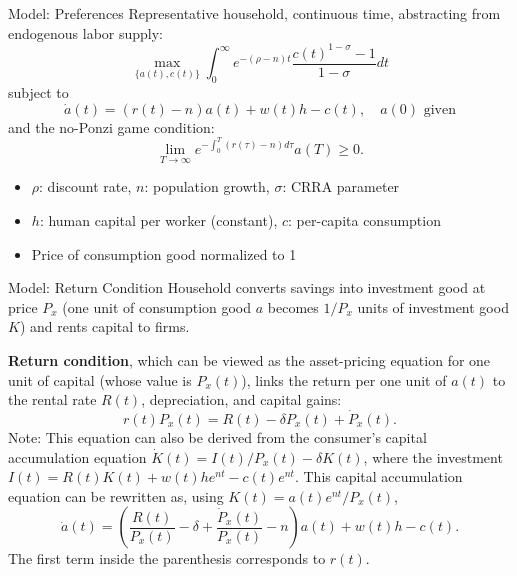 \documentclass[blue]{beamer}
\begin{document}
\begin{frame}{Model: Preferences}
	Representative household, continuous time, abstracting from endogenous labor supply:
	\[
	\max_{\{a(t), c(t)\}} \int_0^\infty e^{-(\rho - n)t} \frac{c(t)^{1-\sigma} - 1}{1-\sigma} dt 
	\]
	subject to
	\[
	\dot{a}(t) = (r(t) - n) a(t) + w(t)h - c(t), \quad a(0) \text{ given}
	\]
	and the no-Ponzi game condition:
	$$\lim_{T\to\infty} e^{-\int_0^T (r(\tau)-n) d\tau} a(T) \geq 0.
	$$
	
	\begin{itemize}
		\item $\rho$: discount rate, $n$: population growth, $\sigma$: CRRA parameter
		\item $h$: human capital per worker (constant), $c$: per-capita consumption
		\item Price of consumption good normalized to 1
	\end{itemize}
\end{frame}


\begin{frame}{Model: Return Condition}
	Household converts savings into investment good at price $P_x$ (one unit of consumption good $a$ becomes $1/P_x$ units of investment good $K$) and rents capital to firms.  

	\textbf{Return condition}, which can be viewed as the asset-pricing equation for one unit of capital (whose value is $P_x(t)$), links the return per one unit of $a(t)$ to the rental rate $R(t)$, depreciation, and capital gains:
	\[
	 r(t)P_x(t) = R(t) - \delta P_x(t) + \dot{P}_x(t).
	\]
	{\footnotesize Note: This equation can also be derived from the consumer's capital accumulation equation $\dot K(t)=I(t)/P_x(t)-\delta K(t)$,
where the investment $I(t)=R(t)K(t)+w(t)he^{nt}-c(t)e^{nt}$. This capital accumulation equation can be rewritten as, using $K(t)=a(t)e^{nt}/P_x(t)$,
$$
\dot a(t)=\left( \frac{R(t)}{P_x(t)} - \delta + \frac{\dot{P}_x(t)}{P_x(t)}-n\right)a(t)+w(t)h-c(t).
$$
The first term inside the parenthesis corresponds to $r(t)$.
}
\end{frame}
\end{document}
